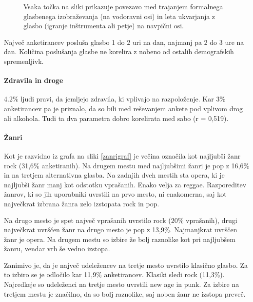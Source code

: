 \documentclass[a4paper, 12pt]{book}
\begin{document}
{\begin{figure}[hbt]
\caption{Vsaka točka na sliki prikazuje povezavo med trajanjem formalnega glasbenega izobraževanja (na vodoravni osi) in leta ukvarjanja z glasbo (igranje inštrumenta ali petje) na navpični osi. }
\label{ukvarjanjeglizobrazba}
\end{figure}

Največ anketirancev posluša glasbo 1 do 2 uri na dan, najmanj pa 2 do 3 ure na dan. Količina poslušanja glasbe ne korelira z nobeno od ostalih demografskih spremenljivk. 

\paragraph{Zdravila in droge}

4.2\% ljudi pravi, da jemljejo zdravila, ki vplivajo na razpoloženje. Kar 3\% anketirancev pa je priznalo, da so bili med reševanjem ankete pod vplivom drog ali alkohola. Tudi ta dva parametra dobro korelirata med sabo (r = 0,519).

\paragraph{Žanri}

Kot je razvidno iz grafa na sliki \ref{zanrigraf} je večina označila kot najljubši žanr rock (31,6\% anketiranih). Na drugem mestu med najljubšimi žanri je pop z 16,6\% in na tretjem alternativna glasba. Na zadnjih dveh mestih sta opera, ki je najljubši žanr manj kot odstotku vprašanih. Enako velja za reggae. Razporeditev žanrov, ki so jih uporabniki uvrstili na prvo mesto, ni enakomerna, saj kot največkrat izbrana žanra zelo izstopata rock in pop.  

Na drugo mesto je spet največ vprašanih uvrstilo rock (20\% vprašanih), drugi največkrat uvrščen žanr na drugo mesto je pop z 13,9\%. Najmanjkrat uvrščen žanr je opera. Na drugem mestu so izbire že bolj raznolike kot pri najljubšem žanru, vendar vrh še vedno izstopa. 

Zanimivo je, da je največ udeležencev na tretje mesto uvrstilo klasično glasbo. Za to izbiro se je odločilo kar 11,9\% anketirancev. Klasiki sledi rock (11,3\%). Najredkeje so udeleženci na tretje mesto uvrstili new age in punk. Za izbire na tretjem mestu je značilno, da so bolj raznolike, saj noben žanr ne izstopa preveč. 

}
\end{document}
